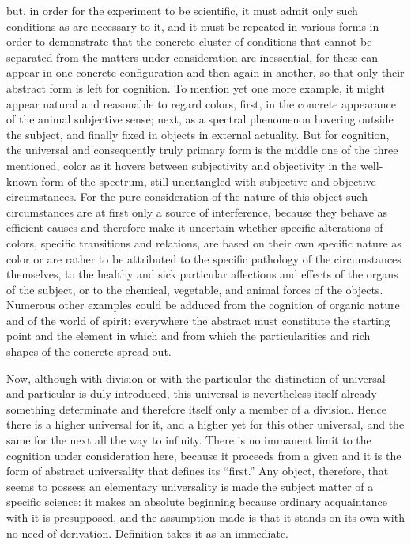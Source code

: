 but, in order for the experiment to be scientific,
it must admit only such conditions as
are necessary to it,
and it must be repeated in various forms
in order to demonstrate that
the concrete cluster of conditions
that cannot be separated from
the matters under consideration are inessential,
for these can appear in one concrete configuration
and then again in another,
so that only their abstract form is left for cognition.
To mention yet one more example,
it might appear natural and reasonable to regard colors,
first, in the concrete appearance of the animal subjective sense;
next, as a spectral phenomenon hovering outside the subject,
and finally fixed in objects in external actuality.
But for cognition, the universal
and consequently truly primary form is
the middle one of the three mentioned,
color as it hovers between subjectivity and objectivity
in the well-known form of the spectrum,
still unentangled with subjective and objective circumstances.
For the pure consideration of the nature of
this object such circumstances are
at first only a source of interference,
because they behave as efficient causes
and therefore make it uncertain
whether specific alterations of colors,
specific transitions and relations,
are based on their own specific nature as color
or are rather to be attributed to
the specific pathology of the circumstances themselves,
to the healthy and sick particular affections
and effects of the organs of the subject,
or to the chemical, vegetable,
and animal forces of the objects.
Numerous other examples could be adduced
from the cognition of organic nature
and of the world of spirit;
everywhere the abstract must constitute
the starting point and the element
in which and from which the
particularities and rich shapes
of the concrete spread out.

Now, although with division or with the particular
the distinction of universal and particular is duly introduced,
this universal is nevertheless itself already something determinate
and therefore itself only a member of a division.
Hence there is a higher universal for it,
and a higher yet for this other universal,
and the same for the next all the way to infinity.
There is no immanent limit to
the cognition under consideration here,
because it proceeds from a given
and it is the form of abstract universality
that defines its “first.”
Any object, therefore, that seems to possess
an elementary universality is
made the subject matter of a specific science:
it makes an absolute beginning
because ordinary acquaintance with it is presupposed,
and the assumption made is
that it stands on its own with no need of derivation.
Definition takes it as an immediate.

